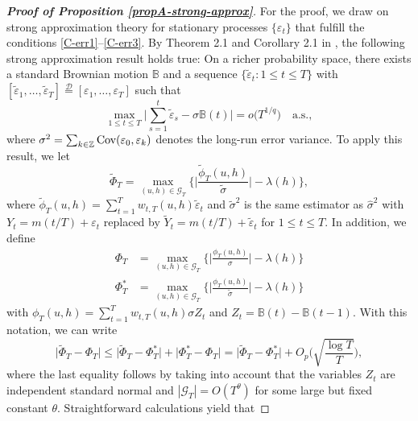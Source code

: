 \documentclass[a4paper,12pt]{article}
\numberwithin{equation}{section}
\begin{document}
\begin{proof}[\textnormal{\textbf{Proof of Proposition \ref{propA-strong-approx}}}] 
For the proof, we draw on strong approximation theory for stationary processes $\{\varepsilon_t\}$ that fulfill the conditions \ref{C-err1}--\ref{C-err3}. By Theorem 2.1 and Corollary 2.1 in \cite{BerkesLiuWu2014}, the following strong approximation result holds true: On a richer probability space, there exists a standard Brownian motion $\mathbb{B}$ and a sequence $\{ \widetilde{\varepsilon}_t: 1 \le t \le T \}$ with $[\widetilde{\varepsilon}_1,\ldots,\widetilde{\varepsilon}_T] \stackrel{\mathcal{D}}{=} [\varepsilon_1,\ldots,\varepsilon_T]$ such that 
\begin{equation}\label{eq-strongapprox-dep}
\max_{1 \le t \le T} \Big| \sum\limits_{s=1}^t \widetilde{\varepsilon}_s - \sigma \mathbb{B}(t) \Big| = o\big( T^{1/q} \big) \quad \text{a.s.},  
\end{equation}
where $\sigma^2 = \sum_{k \in \mathbb{Z}} \textnormal{Cov}(\varepsilon_0, \varepsilon_k)$ denotes the long-run error variance. To apply this result, we let 
\[ \widetilde{\Phi}_T = \max_{(u,h) \in \mathcal{G}_T} \Big\{ \Big|\frac{\widetilde{\phi}_T(u,h)}{\widetilde{\sigma}}\Big| - \lambda(h) \Big\}, \]
where $\widetilde{\phi}_T(u,h) = \sum\nolimits_{t=1}^T w_{t,T}(u,h) \widetilde{\varepsilon}_t$ and $\widetilde{\sigma}^2$ is the same estimator as $\widehat{\sigma}^2$ with $Y_t = m(t/T) + \varepsilon_t$ replaced by $\widetilde{Y}_t = m(t/T) + \widetilde{\varepsilon}_t$ for $1 \le t \le T$. In addition, we define
\begin{align*}
\Phi_T & = \max_{(u,h) \in \mathcal{G}_T} \Big\{ \Big|\frac{\phi_T(u,h)}{\sigma}\Big| - \lambda(h) \Big\} \\
\Phi_T^{*} & = \max_{(u,h) \in \mathcal{G}_T} \Big\{ \Big|\frac{\phi_T(u,h)}{\widetilde{\sigma}}\Big| - \lambda(h) \Big\} 
\end{align*}
with $\phi_T(u,h) = \sum\nolimits_{t=1}^T w_{t,T}(u,h) \sigma Z_t$ and $Z_t = \mathbb{B}(t) - \mathbb{B}(t-1)$. With this notation, we can write 
\begin{equation}\label{eq-strongapprox-bound1}
\big| \widetilde{\Phi}_T - \Phi_T \big| \le \big| \widetilde{\Phi}_T - \Phi_T^{*} \big| + \big| \Phi_T^{*} - \Phi_T \big| = \big| \widetilde{\Phi}_T - \Phi_T^{*} \big| + O_p \Big( \sqrt{\frac{\log T}{T}} \Big), 
\end{equation}
where the last equality follows by taking into account that the variables $Z_t$ are independent standard normal and $|\mathcal{G}_T| = O(T^\theta)$ for some large but fixed constant $\theta$. Straightforward calculations yield that 

\end{proof}
\end{document}
